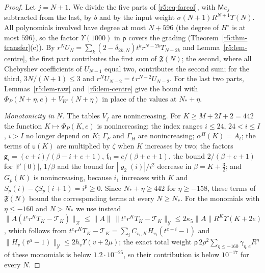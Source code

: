 \documentclass[11pt]{amsart}
\theoremstyle{definition}
\theoremstyle{remark}
\numberwithin{equation}{section}
\newcommand{\nrm}[1]{\lVert #1\rVert}
\begin{document}
\begin{proof}
Let $j=N+1$. We divide the five parts of \eqref{r5:eq-farcol}, with $\mathsf Me_j$ subtracted from the last, by $b$ and by the input weight $\sigma(N+1)R^{N+1}\Upsilon(N)$. All polynomials involved have degree at most $N+596$ (the degree of $H^\circ$ is at most $596$), so the factor $\Upsilon(1000)$ in $\mathsf p$ covers the grading (Theorem~\ref{r5:thm-transfer}(c)). By $r^NU_N=\sum_k(2-\delta_{2k,N})t^kr^{N-2k}T_{N-2k}$ and Lemma~\ref{r5:lem-centre}, the first part contributes the first sum of $\mathfrak F(N)$; the second, where all Chebyshev coefficients of $U_{N-1}$ equal two, contributes the second sum; for the third, $3N/(N+1)\leq3$ and $r^NU_{N-2}=t\,r^{N-2}U_{N-2}$. For the last two parts, Lemmas~\ref{r5:lem-raw} and~\ref{r5:lem-centre} give the bound with $\Phi_P(N+\eta,e)+V_{W^\circ}(N+\eta)$ in place of the values at $N_*+\eta$.

\emph{Monotonicity in $N$.} The tables $V_f$ are nonincreasing. For $K\geq M+2I+2=442$ the function $K\mapsto\Phi_P(K,e)$ is nonincreasing: the index ranges $i\leq24$, $24<i\leq I$, $i>I$ no longer depend on $K$; $\Gamma_F$ and $\Gamma_H$ are nonincreasing; $\alpha^H(K)=A_t$; the terms of $\mathsf u(K)$ are multiplied by $\zeta$ when $K$ increases by two; the factors $\mathsf g_i=(e+i)/(\beta-i+e+1)$, $\mathsf f_0=e/(\beta+e+1)$, the bound $2/(\beta+e+1)$ for $|\mathsf f'(0)|$, $1/\beta$ and the bound for $|\varrho_2(i)|/i^2$ decrease in $\beta=K+\frac32$; and $G_p(K)$ is nonincreasing, because $i_1$ increases with $K$ and $S_p(i)-\zeta S_p(i+1)=i^p\geq0$. Since $N_*+\eta\geq442$ for $\eta\geq-158$, these terms of $\mathfrak F(N)$ bound the corresponding terms at every $N\geq N_*$. For the monomials with $\eta\leq-160$ and $N>N_*$ we use instead $\nrm{A(t^er^KT_K-\mathcal T_K)}_{\mathcal X}\leq\nrm A\,\nrm{t^er^KT_K-\mathcal T_K}_{\mathcal Y}\leq2\kappa_5\nrm AR^K\Upsilon(K+2e)$, which follows from $t^er^KT_K-\mathcal T_K=\sum_iC_{v_i,K}H_{v_i}(t^{e+i}-1)$ and $\nrm{H_v(t^\mu-1)}_{\mathcal Y}\leq2h_v\Upsilon(v+2\mu)$; the exact total weight $\mathsf p\,2\rho^2\sum_{\eta\leq-160}\gamma_{\eta,e}R^\eta$ of these monomials is below $1.2\cdot10^{-25}$, so their contribution is below $10^{-17}$ for every $N$.


\end{proof}
\end{document}

